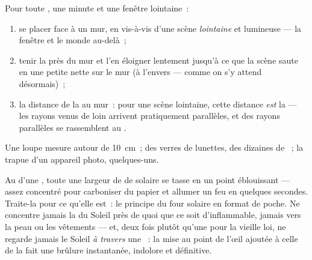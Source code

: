 \begin{method}\label{met:g8:lenses-images:measure}
Pour toute , une minute et une fenêtre lointaine~:
\begin{enumerate}
  \item se placer face à un mur, en vis-à-vis d'une scène
        \emph{lointaine} et lumineuse --- la fenêtre et le monde
        au-delà~;
  \item tenir la  près du mur et l'en éloigner lentement
        jusqu'à ce que la scène saute en une petite  nette sur
        le mur (à l'envers --- comme on s'y attend désormais)~;
  \item {} la distance de la  au mur~: pour une scène
        lointaine, cette distance \emph{est} la  ---
        les rayons venus de loin arrivent pratiquement parallèles,
        et des rayons parallèles se rassemblent au .
\end{enumerate}
Une loupe mesure autour de \qty{10}{cm}~; des verres de lunettes, des
dizaines de ~; la  trapue d'un appareil photo,
quelques-uns.
\end{method}

\begin{remark}\label{rem:g8:lenses-images:burning}
Au  d'une , toute une largeur de  de
 solaire se tasse en un point éblouissant --- assez concentré
pour carboniser du papier et allumer un feu en quelques secondes.
Traite-la pour ce qu'elle est~: le principe du four solaire en format
de poche. Ne concentre jamais la  du Soleil près de quoi que ce
soit d'inflammable, jamais vers la peau ou les vêtements --- et, deux
fois plutôt qu'une pour la vieille loi, ne regarde jamais le Soleil
\emph{à travers} une ~: la mise au point de l'œil ajoutée à
celle de la  fait une brûlure instantanée, indolore et
définitive.
\end{remark}

